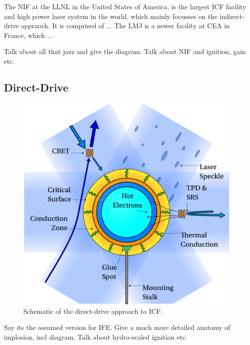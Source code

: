 The \ac{NIF} at the \ac{LLNL} in the United States of America, is the largest \ac{ICF} facility and high power laser system in the world, which mainly focusses on the indirect-drive appraoch.
It is comprised of ...
The \ac{LMJ} is a newer facility at \ac{CEA} in France, which ...

Talk about all that jazz and give the diagram.
Talk about NIF and ignition, gain etc.

\subsection{Direct-Drive}%
\label{sec:intro_direct}

\begin{figure}[t!]
    \includegraphics[width=0.7\linewidth]{Introduction/Images/direct icf white.png}
    \centering
    \caption{Schematic of the direct-drive approach to \ac{ICF}.
    }%
    \label{fig:intro_direct}
\end{figure}

Say its the assumed version for IFE.
Give a much more detailed anatomy of implosion, incl diagram.
Talk about hydro-scaled ignition etc.

